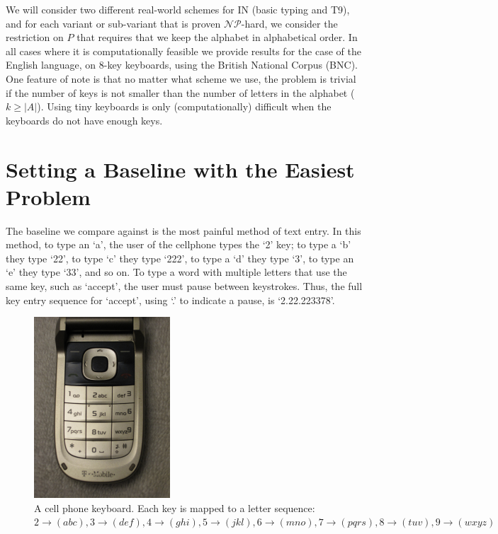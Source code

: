 \documentclass[runningheads]{llncs}
\newcommand{\NP}{\ensuremath{\mathcal{NP}}}
\begin{document}
We will consider two different real-world schemes for $\mathrm{IN}$ (basic
typing and T9), and for each variant or sub-variant that is proven \NP-hard, we
consider the restriction on $P$ that requires that we keep the alphabet in
alphabetical order.  In all cases where it is computationally feasible we
provide results for the case of the English language, on 8-key keyboards, using
the British National Corpus\cite{bnc} (BNC).  One feature of note is that no
matter what scheme we use, the problem is trivial if the number of keys is not
smaller than the number of letters in the alphabet ($k \ge |A|$).  Using tiny
keyboards is only (computationally) difficult when the keyboards do not have
enough keys.

\section{Setting a Baseline with the Easiest Problem}

The baseline we compare against is the most painful method of text entry.  In
this method, to type an `a', the user of the cellphone types the `2' key; to
type a `b' they type `22', to type `c' they type `222', to type a `d' they type
`3', to type an `e' they type `33', and so on.  To type a word with multiple
letters that use the same key, such as `accept', the user must pause between
keystrokes.  Thus, the full key entry sequence for `accept', using `.' to
indicate a pause, is `2.22.223378'.

\begin{figure}[t]
\begin{center}
\includegraphics[width=2in]{phonekeys.jpg}
\end{center}
\caption{A cell phone keyboard. Each key is mapped to a letter sequence: $2 \to (abc), 3\to (def), 4\to (ghi), 5\to (jkl), 6 \to (mno), 7 \to (pqrs), 8\to (tuv), 9\to (wxyz) $}
\label{keypic}
\end{figure}
\end{document}
